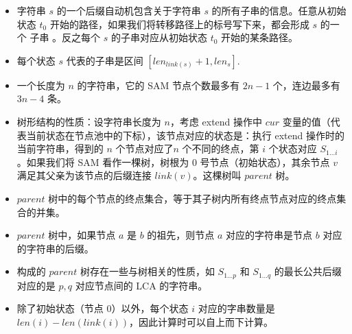 \begin{itemize}
\item 字符串 $s$ 的一个后缀自动机包含关于字符串 $s$ 的所有子串的信息。任意从初始状态 $t_0$ 开始的路径，如果我们将转移路径上的标号写下来，都会形成 $s$ 的一个 子串 。反之每个 $s$ 的子串对应从初始状态 $t_0$  开始的某条路径。
\item 每个状态 $s$ 代表的子串是区间 $[len_{link(s)}+1, len_s]$.
\item 一个长度为 $n$ 的字符串，它的 SAM 节点个数最多有 $2n-1$ 个，连边最多有 $3n-4$ 条。
\item 树形结构的性质：设字符串长度为 $n$，考虑 extend 操作中 $cur$ 变量的值（代表当前状态在节点池中的下标），该节点对应的状态是：执行 extend 操作时的当前字符串，得到的 $n$ 个节点对应了$n$ 个不同的终点，第 $i$ 个状态对应 $S_{1...i}$。如果我们将 SAM 看作一棵树，树根为 $0$ 号节点（初始状态），其余节点 $v$ 满足其父亲为该节点的后缀连接 $link(v)$。这棵树叫 $parent$ 树。
\item $parent$ 树中的每个节点的终点集合，等于其子树内所有终点节点对应的终点集合的并集。
\item $parent$ 树中，如果节点 $a$ 是 $b$ 的祖先，则节点 $a$ 对应的字符串是节点 $b$ 对应的字符串的后缀。
\item 构成的 $parent$ 树存在一些与树相关的性质，如 $S_{1...p}$ 和 $S_{1...q}$ 的最长公共后缀对应的是 $p, q$ 对应节点间的 LCA 的字符串。
\item 除了初始状态（节点 $0$）以外，每个状态 $i$ 对应的字串数量是 $len(i) - len(link(i))$，因此计算时可以自上而下计算。
\end{itemize}

